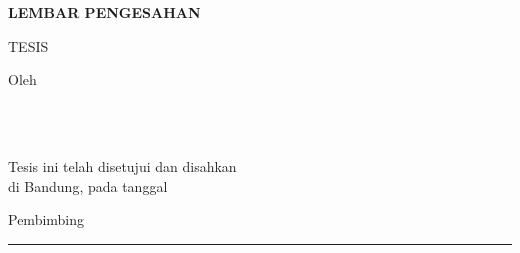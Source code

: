 \thispagestyle{empty}
\begin{center}
{\bfseries LEMBAR PENGESAHAN}

\vspace{2\baselineskip}
{\bfseries\fontsize{14}{16}\selectfont \ThesisTitleID}

\vspace{2\baselineskip}
TESIS

\vspace{2\baselineskip}
Oleh\\
\textbf{\ThesisAuthor}\\
\ThesisNIM

\vspace{2\baselineskip}
\ThesisProgramID\\
\ThesisInstitution

\vspace{3\baselineskip}
Tesis ini telah disetujui dan disahkan\\
di Bandung, pada tanggal \ThesisApprovalDate

\vspace{3\baselineskip}
Pembimbing

\vspace{4\baselineskip}
\rule{6cm}{0.4pt}\\
\SupervisorOne\\
\SupervisorOneNIP
\end{center}
